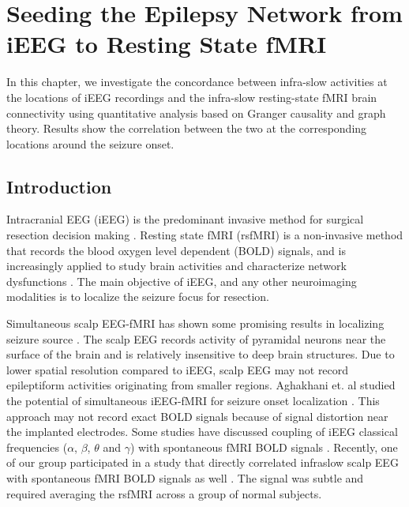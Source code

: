 
\chapter{Seeding the Epilepsy Network from iEEG to Resting State fMRI}
\label{chapter-seeding-iEEG-to-fmri}
In this chapter, we investigate the concordance between infra-slow activities at the locations of iEEG recordings and the infra-slow resting-state fMRI brain connectivity using quantitative analysis based on Granger causality and graph theory. Results show the correlation between the two at the corresponding locations around the seizure onset. 

\section{Introduction}
Intracranial EEG (iEEG) is the predominant invasive method for surgical resection decision making \citep{shah2014invasive}. Resting state fMRI (rsfMRI) is a non-invasive method that records the blood oxygen level dependent (BOLD) signals, and is increasingly applied to study brain activities and characterize network dysfunctions \citep{centeno2014network}. The main objective of iEEG, and any other neuroimaging modalities is to localize the seizure focus for resection.

Simultaneous scalp EEG-fMRI has shown some promising results in localizing seizure source \citep{bettus2011interictal, bagshaw2006correspondence,su2019fmri,an2013electroencephalography,thornton2010eeg}. The scalp EEG records activity of pyramidal neurons near the surface of the brain and is relatively insensitive to deep brain structures. Due to lower spatial resolution compared to iEEG, scalp EEG may not record epileptiform activities originating from smaller regions. Aghakhani et. al studied the potential of simultaneous iEEG-fMRI for seizure onset localization  \citep{aghakhani2015co}. This approach may not record exact BOLD signals because of signal distortion near the implanted electrodes. Some studies have discussed coupling of iEEG classical frequencies ($\alpha$, $\beta$, $\theta$ and $\gamma$) with spontaneous fMRI BOLD signals \citep{bettus2011interictal, shah2019characterizing}. Recently, one of our group participated in a study that directly correlated infraslow scalp EEG with spontaneous fMRI BOLD signals as well \citep{grooms2017infraslow}. The signal was subtle and required averaging the rsfMRI across a group of normal subjects.

